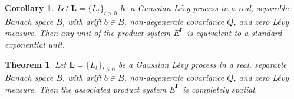 \documentclass[10pt,a4paper]{amsart}
\newtheorem{theorem}{Theorem}
\newtheorem{corollary}{Corollary}
\begin{document}
\begin{corollary}\label{cor:extension}
Let \( \bm{L} = \{L_t\}_{t > 0} \) be a Gaussian L\'evy process in a real, separable Banach space \( B \), with drift \( b \in B \), non-degenerate covariance \( Q \), and zero L\'evy measure. Then any unit of the product system \( E^{\bm{L}} \) is equivalent to a standard exponential unit. 
\end{corollary}

\begin{theorem}\label{theorem:completely_spatial}
Let \( \bm{L} = \{ L_t \}_{t > 0} \) be a Gaussian L\'evy process in a real, separable Banach space \( B \), with drift \( b \in B \), non-degenerate covariance \( Q \), and zero L\'evy measure. Then the associated product system \( E^{\bm{L}} \) is completely spatial.
\end{theorem}
\end{document}
